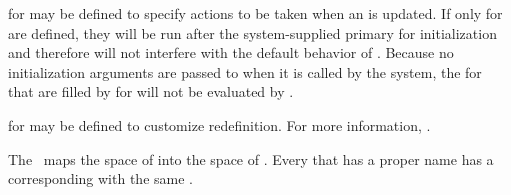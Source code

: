 \endsubsubsection%

             

 for  may be 
defined to specify actions to be taken when an  is updated.
If only  for  are
defined, they will be run after the system-supplied primary  for
initialization and therefore will not interfere with the default
behavior of .  Because no
initialization arguments are passed to 
when it is called by the system, the 
 for  
that are filled by  for  
will not be evaluated by .

 for  may be defined to customize
 redefinition.  For more information, \seesection\SharedInitialize.

\endsubsubsection%

%
% 
% 
% 
% 
% 
% 

\endsubsection%

                                              
The \CLOS\ maps the space of  into the space of .
Every  that has a proper name has a corresponding  
with the same .  

